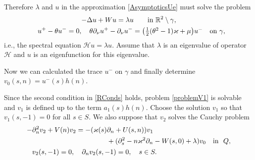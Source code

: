 \documentclass[reqno]{amsart}
\theoremstyle{plain}
\numberwithin{equation}{section}
\renewcommand{\kappa}{\varkappa}
\newcommand{\Real}{\mathbb R}
\newcommand{\cH}{\mathcal{H}}
\newcommand{\pte}{\partial_n}
\begin{document}
Therefore  $\lambda$ and $u$ in the approximation \eqref{AsymptoticsUe} must solve the problem
\begin{gather}\label{LimitProblemEq}
-\Delta u+Wu=\lambda u \qquad \hbox{in  } \Real^2\setminus \gamma,
\\ \label{RConds}
 \phantom{-}u^+-\theta u^-=0,  \quad
\theta\partial_\nu u^+-\partial_\nu u^-
=\big(\textstyle\frac{1}{2}(\theta^2-1)\kappa+\mu \big) u^- \quad \hbox{on } \gamma,
\end{gather}
i.e., the spectral equation $\cH u=\lambda u$.
Assume that $\lambda$ is an eigenvalue of operator $\cH$ and $u$  is an eigenfunction for this eigenvalue.

Now we can calculated the trace $u^-$ on $\gamma$ and  finally determine $v_0(s,n)=u^-(s)h(n)$.

Since the second condition in \eqref{RConds} holds,
problem \eqref{problemV1} is solvable and $v_1$ is defined up to the term $a_1(s) h(n)$.
Choose the solution $v_1$ so that $v_1(s,-1)=0$ for all $s\in S$.
We also suppose that $v_2$ solves the Cauchy problem
\begin{align}
&\begin{aligned}\label{problemV2eqn}
  -\pte^2 v_2+V(n)v_2=-(\kappa(s)&\pte +U(s,n)) v_1\\
  &+(\partial^2_s-n\kappa^2\partial_n-W(s,0)+\lambda)v_0
  \quad \hbox{in \ } Q,
\end{aligned}
\\\label{problemV2conditions}
 & \phantom{-} v_2(s, -1)=0,
 \quad
 \partial_n v_2(s, -1)=0, \quad s\in S.
\end{align}
\end{document}
